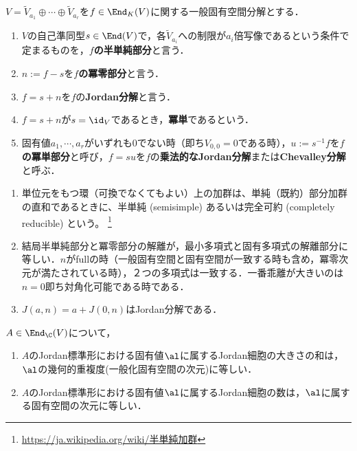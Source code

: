 \documentclass[uplatex, dvipdfmx]{jsreport}
\begin{document}
\begin{definition}
    $V=\widetilde{V}_{a_1}\oplus\cdots\oplus\widetilde{V}_{a_r}$を$f\in\End_K(V)$に関する一般固有空間分解とする．
    \begin{enumerate}
        \item $V$の自己準同型$s\in\End(V)$で，各$\widetilde{V}_{a_i}$への制限が$a_i$倍写像であるという条件で定まるものを，\textbf{$f$の半単純部分}と言う．
        \item $n:=f-s$を\textbf{$f$の冪零部分}と言う．
        \item $f=s+n$を$f$の\textbf{Jordan分解}と言う．
        \item $f=s+n$が$s=\id_V$であるとき，\textbf{冪単}であるという．
        \item 固有値$a_1,\cdots,a_r$がいずれも$0$でない時（即ち$V_{0,0}=0$である時），$u:=s^{-1}f$を\textbf{$f$の冪単部分}と呼び，$f=su$を$f$の\textbf{乗法的なJordan分解}または\textbf{Chevalley分解}と呼ぶ．
    \end{enumerate}
\end{definition}
\begin{remark}\mbox{}
    \begin{enumerate}
        \item 単位元をもつ環（可換でなくてもよい）上の加群は、単純（既約）部分加群の直和であるときに、半単純 (semisimple) あるいは完全可約 (completely reducible) という。 \footnote{\url{https://ja.wikipedia.org/wiki/半単純加群}}
        \item 結局半単純部分と冪零部分の解離が，最小多項式と固有多項式の解離部分に等しい．$n$がfullの時（一般固有空間と固有空間が一致する時も含め，冪零次元が満たされている時），２つの多項式は一致する．一番乖離が大きいのは$n=0$即ち対角化可能である時である．
        \item $J(a,n)=a+J(0,n)$はJordan分解である．
    \end{enumerate}
\end{remark}

\begin{corollary}[固有空間と一般化固有空間の乖離]
    $A\in\End_\C(V)$について，
    \begin{enumerate}
        \item $A$のJordan標準形における固有値$\al$に属するJordan細胞の大きさの和は，$\al$の幾何的重複度(一般化固有空間の次元)に等しい．
        \item $A$のJordan標準形における固有値$\al$に属するJordan細胞の数は，$\al$に属する固有空間の次元に等しい．
    \end{enumerate}
\end{corollary}
\end{document}
